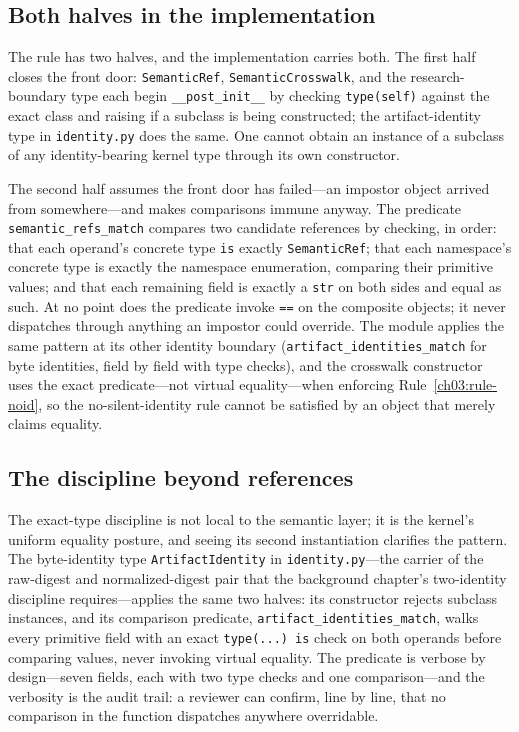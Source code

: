 \subsection{Both halves in the implementation}\label{ch03:bothhalves}

The rule has two halves, and the implementation carries both. The
first half closes the front door: \texttt{SemanticRef},
\texttt{SemanticCrosswalk}, and the research-boundary type each
begin \texttt{\_\_post\_init\_\_} by checking
\texttt{type(self)} against the exact class and raising if a
subclass is being constructed; the artifact-identity type in
\texttt{identity.py} does the same. One cannot obtain an instance
of a subclass of any identity-bearing kernel type through its own
constructor.

The second half assumes the front door has failed---an impostor
object arrived from somewhere---and makes comparisons immune
anyway. The predicate \texttt{semantic\_refs\_match} compares two
candidate references by checking, in order: that each operand's
concrete type \texttt{is} exactly \texttt{SemanticRef}; that each
namespace's concrete type is exactly the namespace enumeration,
comparing their primitive values; and that each remaining field
is exactly a \texttt{str} on both sides and equal as such. At no
point does the predicate invoke \texttt{==} on the composite
objects; it never dispatches through anything an impostor could
override. The module applies the same pattern at its other
identity boundary (\texttt{artifact\_identities\_match} for byte
identities, field by field with type checks), and the crosswalk
constructor uses the exact predicate---not virtual equality---when
enforcing Rule~\ref{ch03:rule-noid}, so the no-silent-identity
rule cannot be satisfied by an object that merely claims equality.

\subsection{The discipline beyond references}\label{ch03:beyond}

The exact-type discipline is not local to the semantic layer; it
is the kernel's uniform equality posture, and seeing its second
instantiation clarifies the pattern. The byte-identity type
\texttt{ArtifactIdentity} in \texttt{identity.py}---the carrier of
the raw-digest and normalized-digest pair that the background
chapter's two-identity discipline requires---applies the same two
halves: its constructor rejects subclass instances, and its
comparison predicate, \texttt{artifact\_identities\_match}, walks
every primitive field with an exact \texttt{type(...) is} check
on both operands before comparing values, never invoking virtual
equality. The predicate is verbose by design---seven fields, each
with two type checks and one comparison---and the verbosity is
the audit trail: a reviewer can confirm, line by line, that no
comparison in the function dispatches anywhere overridable.

